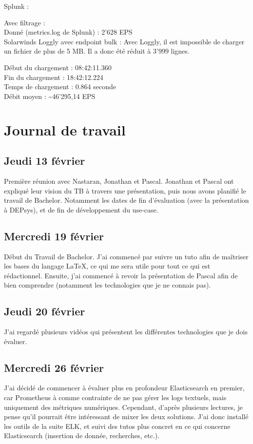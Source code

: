 \documentclass[paper=a4, fontsize=11pt]{scrartcl}
\begin{document}
Splunk :

Avec filtrage : \\
Donné (metrics.log de Splunk) : 2'628 EPS \\

Solarwinds Loggly avec endpoint bulk :
Avec Loggly, il est impossible de charger un fichier de plus de 5 MB. Il a donc été réduit à 3'999 lignes.

Début du chargement : 08:42:11.360 \\
Fin du chargement : 18:42:12.224 \\
Temps de chargement : 0.864 seconde \\
Débit moyen : \textasciitilde 46'295,14 EPS \\

\section{Journal de travail}


\subsection{Jeudi 13 février}
    Première réunion avec Nastaran, Jonathan et Pascal. Jonathan et Pascal ont expliqué leur vision du TB à travers une présentation, puis nous avons planifié le travail de Bachelor. Notamment les dates de fin d'évaluation (avec la présentation à DEPsys), et de fin de développement du use-case.
\subsection{Mercredi 19 février}
    Début du Travail de Bachelor. J'ai commencé par suivre un tuto afin de maîtriser les bases du langage \LaTeX, ce qui me sera utile pour tout ce qui est rédactionnel. Ensuite, j'ai commencé à revoir la présentation de Pascal afin de bien comprendre (notamment les technologies que je ne connais pas).
\subsection{Jeudi 20 février}
    J'ai regardé plusieurs vidéos qui présentent les différentes technologies que je dois évaluer.
\subsection{Mercredi 26 février}
    J'ai décidé de commencer à évaluer plus en profondeur Elasticsearch en premier, car Prometheus à comme contrainte de ne pas gérer les logs textuels, mais uniquement des métriques numériques. Cependant, d'après plusieurs lectures, je pense qu'il pourrait être intéressant de mixer les deux solutions. J'ai donc installé les outils de la suite ELK, et suivi des tutos plus concret en ce qui concerne Elasticsearch (insertion de donnée, recherches, etc.).
\end{document}
